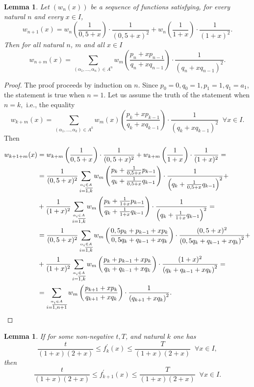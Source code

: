 \documentclass[11pt]{amsart}
\theoremstyle{plain}
\newtheorem{lemma}[theorem]{Lemma}
\theoremstyle{remark}
\begin{document}
\begin{lemma}\label{lema5}
Let $(w_{n}(x))$ be a sequence of functions satisfying, for every natural $n$ and every $x \in I$,
$$
    w_{n+1}(x)=w_{n}\left( \frac{1}{0,5+x}\right)\cdot\frac{1}{(0,5+x)^2}+w_{n}\left( \frac{1}{1+x}\right)\cdot\frac{1}{(1+x)^2}.
$$
Then for all natural $n$, $m$ and all $x\in I$ 
  $$
  w_{n+m}(x)=\sum_{(\alpha_1,...,\alpha_n)\in A^n} w_{m}\left(\frac{p_n+xp_{n-1}}{q_n+xq_{n-1}} \right)\cdot\frac{1}{(q_n+xq_{n-1})^2}.
  $$
  \end{lemma}
  \begin{proof}
    The proof proceeds by induction on $n$. Since $ p_0=0, q_0=1, p_1=1,q_1=a_1$, the statement is true  when $n=1$.
    Let us assume the truth of the statement  when $n=k,$ i.e., the equality
    $$
    w_{k+m}(x)=\sum_{(\alpha_1,...,\alpha_k)\in A^k} w_{m}(x)\left(\frac{p_k+xp_{k-1}}{q_k+xq_{k-1}} \right)\cdot\frac{1}{(q_k+xq_{k-1})^2} \;\; \forall x\in I.
    $$
    Then
    \begin{align*}
      w_{k+1+m}(x)&=w_{k+m}\left( \frac{1}{0,5+x}\right)\cdot\frac{1}{(0,5+x)^2}+w_{k+m}\left( \frac{1}{1+x}\right)\cdot\frac{1}{(1+x)^2}=\\
      &=\frac{1}{(0,5+x)^2}\sum_{\stackrel{\alpha_i\in A}{i=\overline{1,k}}} w_{m} \left(\frac{p_k+\frac{1}{0,5+x}p_{k-1}}{q_k+\frac{1}{0,5+x}q_{k-1}}\right)\cdot
          \frac{1}{\left({q_k+\frac{1}{0,5+x}q_{k-1}}\right)^2}+\\
      &+\frac{1}{(1+x)^2}\sum_{\stackrel{\alpha_i\in A}{i=\overline{1,k}}}   w_{m}\left(\frac{p_k+\frac{1}{1+x}p_{k-1}}{q_k+\frac{1}{1+x}q_{k-1}}\right)\cdot
     \frac{1}{\left({q_k+\frac{1}{1+x}q_{k-1}}\right)^2}=\\
     &=\frac{1}{(0,5+x)^2}\sum_{\stackrel{\alpha_i\in A}{i=\overline{1,k}}} w_{m}\left(\frac{0,5p_k+p_{k-1}+xp_k}{0,5q_k+q_{k-1}+xq_k}\right)
             \cdot\frac{(0,5+x)^2}{\left({0,5q_k+q_{k-1}+xq_k}\right)^2}+\\
     &+\frac{1}{(1+x)^2}\sum_{\stackrel{\alpha_i\in A}{i=\overline{1,k}}}  w_{m}\left(\frac{p_k+p_{k-1}+xp_k}{q_k+q_{k-1}+xq_k}\right)
     \cdot\frac{(1+x)^2}{\left({q_k+q_{k-1}+xq_k}\right)^2}=\\
     &=\sum_{\stackrel{\alpha_i\in A}{i=\overline{1,n+1}}}w_{m} \left(\frac{p_{k+1}+xp_k}{q_{k+1}+xq_k}\right)\cdot\frac{1}{\left({q_{k+1}+xq_k}\right)^2}.
   \qedhere \end{align*}
      \end{proof}
\begin{lemma}\label{lema6}
   If for some non-negative $t,T$, and natural $k$ one has $$
   \frac{t}{(1+x)(2+x)}\leq f_{k}^{\prime}(x)\leq\frac{T}{(1+x)(2+x)}\;\;\forall x\in I,
   $$ then
  \begin{equation}\label{eq}
    \frac{t}{(1+x)(2+x)}\leq f_{k+1}^{\prime}(x)\leq\frac{T}{(1+x)(2+x)}\;\;\forall x\in I.
  \end{equation}
 \end{lemma}
\end{document}
